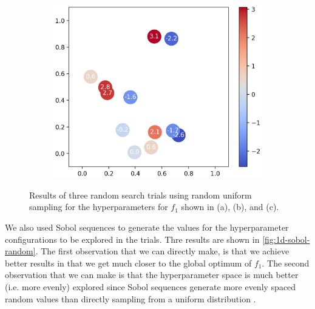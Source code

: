 \documentclass[11pt]{article}
\begin{document}
\begin{figure}[H]
\begin{subfigure}[b]{0.325\textwidth}
		\centering
		\includegraphics[width=\textwidth]{assets/1d-3rd}
		\caption{}
	\end{subfigure}

	\caption{Results of three random search trials using random uniform sampling for the hyperparameters for $f_1$ shown in (a), (b), and (c).}
	\label{fig:1d-random}
\end{figure}

\noindent We also used Sobol sequences to generate the values for the hyperparameter configurations to be explored in the trials. Thre results are shown in \autoref{fig:1d-sobol-random}. The first observation that we can directly make, is that we achieve better results in that we get much closer to the global optimum of $f_1$. The second observation that we can make is that the hyperparameter space is much better (i.e. more evenly) explored since Sobol sequences generate more evenly spaced random values than directly sampling from a uniform distribution \cite{bergstra2012random}. 
\end{document}
